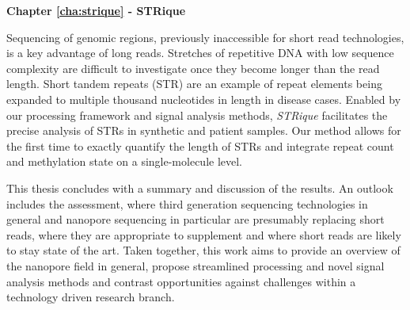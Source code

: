 \textbf{Chapter \ref{cha:strique} - STRique}

Sequencing of genomic regions, previously inaccessible for short read technologies, is a key advantage of long reads.
Stretches of repetitive DNA with low sequence complexity are difficult to investigate once they become longer than the read length.
Short tandem repeats (STR) are an example of repeat elements being expanded to multiple thousand nucleotides in length in disease cases.
Enabled by our processing framework and signal analysis methods, \textit{STRique} facilitates the precise analysis of STRs in synthetic and patient samples.
Our method allows for the first time to exactly quantify the length of STRs and integrate repeat count and methylation state on a single-molecule level.


This thesis concludes with a summary and discussion of the results.
An outlook includes the assessment, where third generation sequencing technologies in general and nanopore sequencing in particular are presumably replacing short reads, where they are appropriate to supplement and where short reads are likely to stay state of the art.
Taken together, this work aims to provide an overview of the nanopore field in general, propose streamlined processing and novel signal analysis methods and contrast opportunities against challenges within a technology driven research branch.







